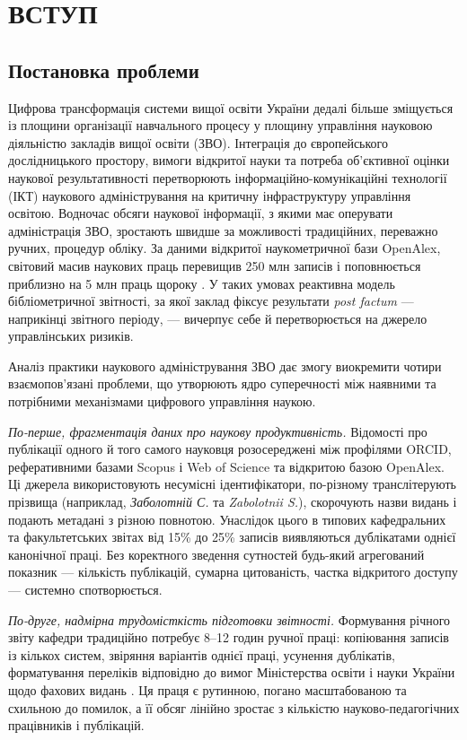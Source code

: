 \section*{ВСТУП}

\subsection*{Постановка проблеми}

Цифрова трансформація системи вищої освіти України дедалі більше зміщується із площини організації навчального процесу у площину управління науковою діяльністю закладів вищої освіти (ЗВО). Інтеграція до європейського дослідницького простору, вимоги відкритої науки та потреба об'єктивної оцінки наукової результативності перетворюють інформаційно-комунікаційні технології (ІКТ) наукового адміністрування на критичну інфраструктуру управління освітою. Водночас обсяги наукової інформації, з якими має оперувати адміністрація ЗВО, зростають швидше за можливості традиційних, переважно ручних, процедур обліку. За даними відкритої наукометричної бази OpenAlex, світовий масив наукових праць перевищив 250 млн записів і поповнюється приблизно на 5 млн праць щороку \cite{OpenAlex2024Docs}. У таких умовах реактивна модель бібліометричної звітності, за якої заклад фіксує результати \textit{post factum} --- наприкінці звітного періоду, --- вичерпує себе й перетворюється на джерело управлінських ризиків.

Аналіз практики наукового адміністрування ЗВО дає змогу виокремити чотири взаємопов'язані проблеми, що утворюють ядро суперечності між наявними та потрібними механізмами цифрового управління наукою.

\textit{По-перше, фрагментація даних про наукову продуктивність.} Відомості про публікації одного й того самого науковця розосереджені між профілями ORCID, реферативними базами Scopus і Web of Science та відкритою базою OpenAlex. Ці джерела використовують несумісні ідентифікатори, по-різному транслітерують прізвища (наприклад, \textit{Заболотній С.} та \textit{Zabolotnii S.}), скорочують назви видань і подають метадані з різною повнотою. Унаслідок цього в типових кафедральних та факультетських звітах від 15\% до 25\% записів виявляються дублікатами однієї канонічної праці. Без коректного зведення сутностей будь-який агрегований показник --- кількість публікацій, сумарна цитованість, частка відкритого доступу --- системно спотворюється.

\textit{По-друге, надмірна трудомісткість підготовки звітності.} Формування річного звіту кафедри традиційно потребує 8--12 годин ручної праці: копіювання записів із кількох систем, звіряння варіантів однієї праці, усунення дублікатів, форматування переліків відповідно до вимог Міністерства освіти і науки України щодо фахових видань \cite{MONUkraine2023ProfessionalJournalsOrder}. Ця праця є рутинною, погано масштабованою та схильною до помилок, а її обсяг лінійно зростає з кількістю науково-педагогічних працівників і публікацій.

